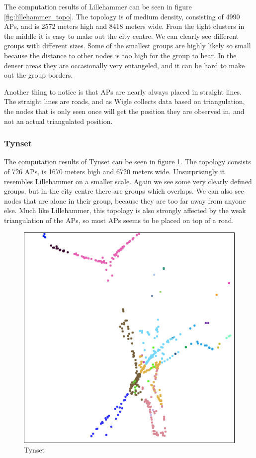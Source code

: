 	The computation results of Lillehammer can be seen in figure \ref{fig:lillehammer_topo}.
	The topology is of medium density, consisting of 4990 APs, and is 2572 meters high 
	and 8418 meters wide. From the tight clusters in the middle it is easy to make out the city centre.
	We can clearly see different groups with different sizes. Some of the smallest groups
	are highly likely so small because the distance to other nodes is too high for
	the group to hear. In the denser areas they are occasionally very
	entangeled, and it can be hard to make out the group borders.

	Another thing to notice is that APs are nearly always placed in straight lines.
	The straight lines are roads, and as Wigle collects data based on triangulation, the nodes
	that is only seen once will get the position they are observed in, and not an actual
	triangulated position. 
	\subsubsection{Tynset}
	The computation results of Tynset can be seen in figure \ref{fig:tynset_topo}. 
	The topology consists of 726 APs, is 1670 meters high and  6720 meters wide. 
	Unsurprisingly it resembles Lillehammer on a smaller scale.
	Again we see
	some very clearly defined groups, but in the city centre there are groups
	which overlaps. We can also see nodes that are alone in their group,
	because they are too far away from anyone else.
	Much like Lillehammer, this topology is also strongly affected by the weak
	triangulation of the APs, so most APs seems to be placed on top of a road. 

	\begin{figure}
	\center
	\includegraphics[scale=0.46]{Images/cities/tynset_groups.jpg}
	\caption{Tynset}
	\label{fig:tynset_topo}
	\end{figure}

